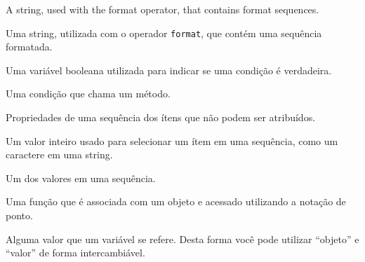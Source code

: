 {\begin{descrição}
\item[format string:] A string, used with the format operator, that
contains format sequences.

\item[string formatada:] Uma string, utilizada com o operador {\tt format},
	que contém uma sequência formatada.


\item[flag:] Uma variável booleana utilizada para indicar se uma condição é
	verdadeira.

\item[invocação:] Uma condição que chama um método.

\item[imutável:] Propriedades de uma sequência dos ítens que não podem ser
	atribuídos.


\item[índice:] Um valor inteiro usado para selecionar um ítem em uma sequência,
	como um caractere em uma string.


\item[item:] Um dos valores em uma sequência.

\item[método:] Uma função que é associada com um objeto e acessado utilizando
	a notação de ponto.


\item[objeto:] Alguma valor que um variável se refere. Desta forma você pode
	utilizar ``objeto'' e ``valor'' de forma intercambiável.


\end{descrição}}
